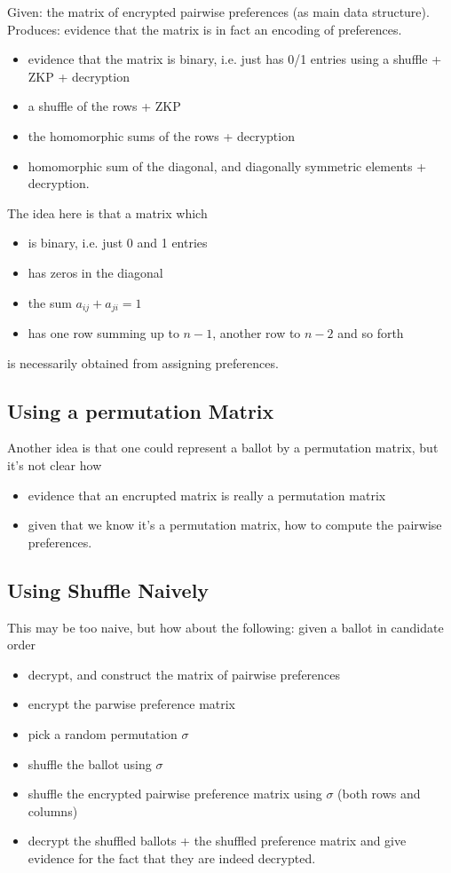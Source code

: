 \documentclass{llncs}
\begin{document}
Given: the matrix of encrypted pairwise preferences (as main data
structure). Produces: evidence that the matrix is in fact an
encoding of preferences.

\begin{itemize}
\item  evidence that the matrix is binary, i.e. just has 0/1 entries
 using a shuffle + ZKP + decryption
\item  a shuffle of the rows + ZKP
\item  the homomorphic sums of the rows + decryption
\item  homomorphic sum of the diagonal, and diagonally symmetric elements
 + decryption.
\end{itemize}

The idea here is that a matrix which 
\begin{itemize}
\item is binary, i.e. just 0 and 1 entries
\item has zeros in the diagonal
\item the sum $a_{ij} + a_{ji} = 1$
\item has one row summing up to $n-1$, another row to $n-2$ and so
forth
\end{itemize}
is necessarily obtained from assigning preferences.

\subsection{Using a permutation Matrix}

Another idea is that one could represent a ballot by a permutation
matrix, but it's not clear how
\begin{itemize}
\item evidence that an encrupted matrix is really a permutation
matrix
\item given that we know it's a permutation matrix, how to compute
the pairwise preferences.
\end{itemize}

\subsection{Using Shuffle Naively}

This may be too naive, but how about the following: given a ballot
in candidate order
\begin{itemize}
\item decrypt, and construct the matrix of pairwise preferences
\item encrypt the parwise preference matrix
\item pick a random permutation $\sigma$ 
\item shuffle the ballot using $\sigma$
\item shuffle the encrypted pairwise preference matrix using
$\sigma$ (both rows and columns)
\item decrypt the shuffled ballots + the shuffled preference matrix
and give evidence for the fact that they are indeed decrypted.
\end{itemize}
\end{document}
